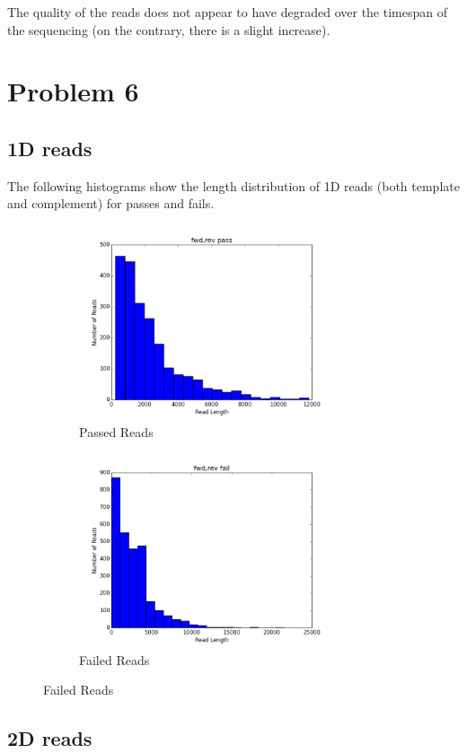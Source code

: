 \documentclass[11pt]{article}
\begin{document}
The quality of the reads does not appear to have degraded over the timespan of the sequencing
(on the contrary, there is a slight increase).
\section*{Problem 6}
\subsection*{1D reads}

        The following histograms show the length distribution of 1D reads (both template and complement) for passes and fails.

        \begin{figure}[h!]
		\begin{subfigure}[b]{0.45\textwidth}
    			\includegraphics[width=3in]{1Dpasses}
    			\caption{Passed Reads}
  		\end{subfigure}
  		\begin{subfigure}[b]{0.45\textwidth}
    			\includegraphics[width=3in]{1Dfailures}
    			\caption{Failed Reads}
  		\end{subfigure}
	\end{figure}
        

\subsection*{2D reads}
\end{document}
